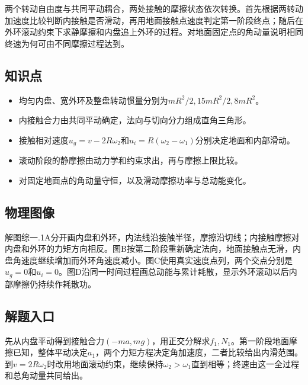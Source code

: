 \documentclass[UTF8,fontset=fandol,a4paper,11pt]{ctexart}
\begin{document}
两个转动自由度与共同平动耦合，两处接触的摩擦状态依次转换。首先根据两转动加速度比较判断内接触是否滑动，再用地面接触点速度判定第一阶段终点；随后在外环滚动约束下求静摩擦和内盘追上外环的过程。对地面固定点的角动量说明相同终速为何可由不同摩擦过程达到。



\subsection*{知识点}

\begin{itemize}
\item 均匀内盘、宽外环及整盘转动惯量分别为$mR^2/2,15mR^2/2,8mR^2$。
\item 内接触合力由共同平动确定，法向与切向分力组成直角三角形。
\item 接触相对速度$u_g=v-2R\omega_2$和$u_i=R(\omega_2-\omega_1)$分别决定地面和内部滑动。
\item 滚动阶段的静摩擦由动力学和约束求出，再与摩擦上限比较。
\item 对固定地面点的角动量守恒，以及滑动摩擦功率与总动能变化。
\end{itemize}



\subsection*{物理图像}

解图综一.1A分开画内盘和外环，内法线沿接触半径，摩擦沿切线；内接触摩擦对内盘和外环的力矩方向相反。图B按第二阶段重新确定法向，地面接触点无滑，内盘角速度继续增加而外环角速度减小。图C使用真实速度点列，两个交点分别是$u_g=0$和$u_i=0$。图D沿同一时间过程画总动能与累计耗散，显示外环滚动以后内部摩擦仍持续作耗散功。



\subsection*{解题入口}

先从内盘平动得到接触合力$(-ma,mg)$，用正交分解求$f_1,N_1$。第一阶段地面摩擦已知，整体平动决定$a_1$，两个力矩方程决定角加速度，二者比较给出内滑范围。到$v=2R\omega_2$时改用地面滚动约束，继续保持$\omega_2>\omega_1$直到相等；终速由这一全过程和总角动量共同给出。
\end{document}
